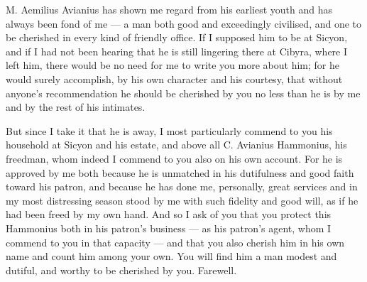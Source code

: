

 M. Aemilius Avianius has shown me regard from his earliest youth and has always been fond of me --- a man both good and exceedingly civilised, and one to be cherished in every kind of friendly office. If I supposed him to be at Sicyon, and if I had not been hearing that he is still lingering there at Cibyra, where I left him, there would be no need for me to write you more about him; for he would surely accomplish, by his own character and his courtesy, that without anyone's recommendation he should be cherished by you no less than he is by me and by the rest of his intimates.

 But since I take it that he is away, I most particularly commend to you his household at Sicyon and his estate, and above all C. Avianius Hammonius, his freedman, whom indeed I commend to you also on his own account. For he is approved by me both because he is unmatched in his dutifulness and good faith toward his patron, and because he has done me, personally, great services and in my most distressing season stood by me with such fidelity and good will, as if he had been freed by my own hand. And so I ask of you that you protect this Hammonius both in his patron's business --- as his patron's agent, whom I commend to you in that capacity --- and that you also cherish him in his own name and count him among your own. You will find him a man modest and dutiful, and worthy to be cherished by you. Farewell.
